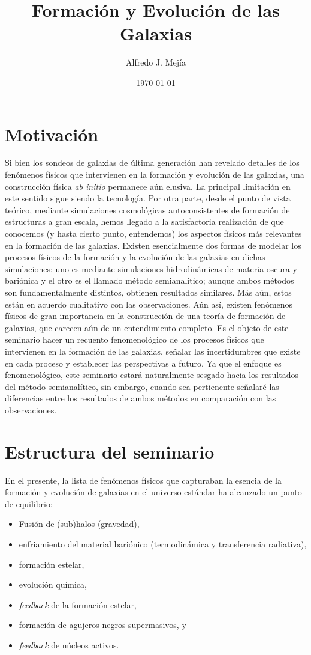 \documentclass{article}
\begin{document}
\title{Formación y Evolución de las Galaxias}
\author{Alfredo J. Mej\'ia}
\date{\today}
\maketitle

\section{Motivación}
%
Si bien los sondeos de galaxias de última generación han revelado detalles de los fenómenos físicos
que intervienen en la formación y evolución de las galaxias, una construcción física \emph{ab
initio} permanece aún elusiva. La principal limitación en este sentido sigue siendo la tecnología.
Por otra parte, desde el punto de vista teórico, mediante simulaciones cosmológicas autoconsistentes
de formación de estructuras a gran escala, hemos llegado a la satisfactoria realización de que
conocemos (y hasta cierto punto, entendemos) los aspectos físicos más relevantes en la formación de
las galaxias. Existen esencialmente dos formas de modelar los procesos físicos de la formación y la
evolución de las galaxias en dichas simulaciones: uno es mediante simulaciones hidrodinámicas de
materia oscura y bariónica y el otro es el llamado método semianalítico; aunque ambos métodos son
fundamentalmente distintos, obtienen resultados similares. Más aún, estos están en acuerdo
cualitativo con las observaciones. Aún así, existen fenómenos físicos de gran importancia en la
construcción de una teoría de formación de galaxias, que carecen aún de un entendimiento completo.
Es el objeto de este seminario hacer un recuento fenomenológico de los procesos físicos que
intervienen en la formación de las galaxias, señalar las incertidumbres que existe en cada proceso y
establecer las perspectivas a futuro. Ya que el enfoque es fenomenológico, este seminario estará
naturalmente sesgado hacia los resultados del método semianalítico, sin embargo, cuando sea
pertienente señalaré las diferencias entre los resultados de ambos métodos en comparación con las
observaciones.
%

\section{Estructura del seminario}
En el presente, la lista de fenómenos físicos que capturaban la esencia de la formación y evolución
de galaxias en el universo estándar ha alcanzado un punto de equilibrio:
\begin{itemize}
\item Fusión de (sub)halos (gravedad),
\item enfriamiento del material bariónico (termodinámica y transferencia radiativa),
\item formación estelar,
\item evolución química,
\item \emph{feedback} de la formación estelar,
\item formación de agujeros negros supermasivos, y
\item \emph{feedback} de núcleos activos.
\end{itemize}
\end{document}
